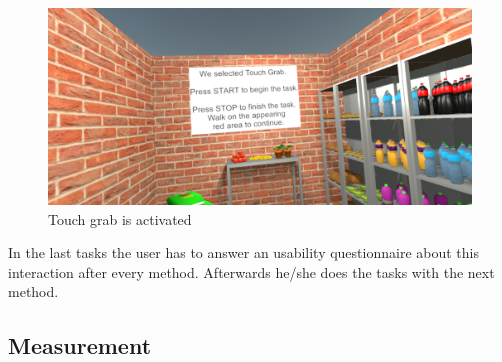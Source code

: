 \begin{figure}[H] 
	\center 
	\includegraphics[width=12cm]{Images/TaskWall_2.PNG}
	\caption[Touch grab is activated]{Touch grab is activated}
	\label{fig:taskW2}
\end{figure}

In the last tasks the user has to answer an usability questionnaire about this interaction after every method. Afterwards he/she does the tasks with the next method. \\

\subsection{Measurement} \label{sec:measurement}



\newpage